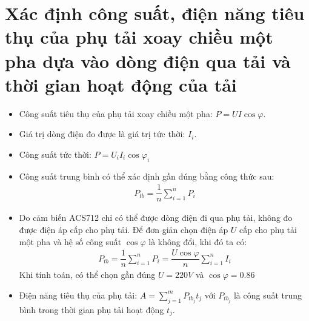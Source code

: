 \section{Xác định công suất, điện năng tiêu thụ của phụ tải xoay chiều một pha dựa vào dòng điện qua tải và thời gian hoạt động của tải}
    \begin{itemize}
        \item Công suất tiêu thụ của phụ tải xoay chiều một pha: $P = UI\cos \varphi$.
        \item Giá trị dòng điện đo được là giá trị tức thời: $I_{i}$.
        \item Công suất tức thời: $P = U_iI_i\cos \varphi_i$
        \item Công suất trung bình có thể xác định gần đúng bằng công thức sau:
            \begin{align*}
                P_{tb} = \dfrac{1}{n}\sum^n_{i=1}P_i
            \end{align*}
        \item Do cảm biến ACS712 chỉ có thể được dòng điện đi qua phụ tải, không đo được điện áp cấp cho phụ tải. Để đơn giản chọn điện áp $U$ cấp cho phụ tải một pha và hệ số công suất $\cos \varphi$ là không đổi, khi đó ta có:
            \begin{align*}
                P_{tb} = \dfrac{1}{n}\sum^n_{i=1}P_i = \dfrac{U\cos \varphi}{n}\sum^n_{i=1}I_i
            \end{align*}
            Khi tính toán, có thể chọn gần đúng $U = 220V$ và $\cos \varphi = 0.86$
        \item Điện năng tiêu thụ của phụ tải: $A = \sum^m_{j=1} P_{tb_j}t_j$ với $P_{tb_j}$ là công suất trung bình trong thời gian phụ tải hoạt động $t_j$.
    \end{itemize}
